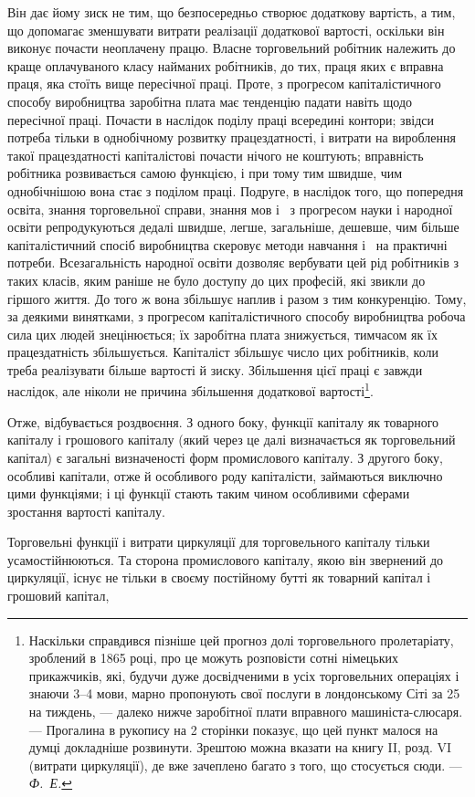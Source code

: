 \parcont{}  %
Він дає йому зиск не тим, що безпосередньо створює додаткову
вартість, а тим, що допомагає зменшувати витрати реалізації додаткової
вартості, оскільки він виконує почасти неоплачену працю.
Власне торговельний робітник належить до краще оплачуваного
класу найманих робітників, до тих, праця яких є вправна праця,
яка стоїть вище пересічної праці. Проте, з прогресом капіталістичного
способу виробництва заробітна плата має тенденцію
падати навіть щодо пересічної праці. Почасти в наслідок поділу
праці всередині контори; звідси потреба тільки в однобічному
розвитку працездатності, і витрати на вироблення такої працездатності
капіталістові почасти нічого не коштують; вправність
робітника розвивається самою функцією, і при тому тим швидше,
чим однобічнішою вона стає з поділом праці. Подруге, в наслідок
того, що попередня освіта, знання торговельної справи,
знання мов і~ з прогресом науки і народної освіти репродукуються
дедалі швидше, легше, загальніше, дешевше, чим
більше капіталістичний спосіб виробництва скеровує методи
навчання і~ на практичні потреби. Всезагальність народної
освіти дозволяє вербувати цей рід робітників з таких класів,
яким раніше не було доступу до цих професій, які звикли до
гіршого життя. До того ж вона збільшує наплив і разом з тим
конкуренцію. Тому, за деякими винятками, з прогресом капіталістичного
способу виробництва робоча сила цих людей знецінюється;
їх заробітна плата знижується, тимчасом як їх
працездатність збільшується. Капіталіст збільшує число цих
робітників, коли треба реалізувати більше вартості й зиску.
Збільшення цієї праці є завжди наслідок, але ніколи не причина
збільшення додаткової вартості\footnote{
Наскільки справдився пізніше цей прогноз долі торговельного пролетаріату,
зроблений в 1865 році, про це можуть розповісти сотні німецьких
прикажчиків, які, будучи дуже досвідченими в усіх торговельних операціях
і знаючи 3--4 мови, марно пропонують свої послуги в лондонському Сіті за
25 на тиждень, — далеко нижче заробітної плати вправного машиніста-слюсаря. — Прогалина в
рукопису на 2 сторінки показує, що цей пункт
малося на думці докладніше розвинути. Зрештою можна вказати на книгу II,
розд. VI (витрати циркуляції),
де вже зачеплено багато з того, що стосується сюди. — \emph{Ф.~Е.}
}.

Отже, відбувається роздвоєння. З одного боку, функції капіталу
як товарного капіталу і грошового капіталу (який через
це далі визначається як торговельний капітал) є загальні визначеності
форм промислового капіталу. З другого боку, особливі
капітали, отже й особливого роду капіталісти, займаються виключно
цими функціями; і ці функції стають таким чином особливими
сферами зростання вартості капіталу.

Торговельні функції і витрати циркуляції для торговельного
капіталу тільки усамостійнюються. Та сторона промислового капіталу,
якою він звернений до циркуляції, існує не тільки в своєму
постійному бутті як товарний капітал і грошовий капітал,
\parbreak{}  %
